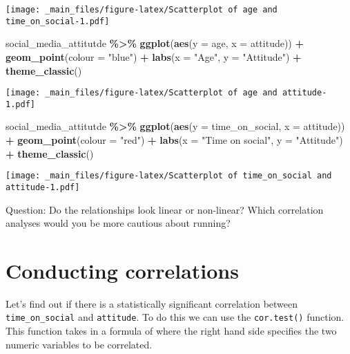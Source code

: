 \documentclass[
]{book}
\newenvironment{Shaded}{\begin{snugshade}}{\end{snugshade}}
\newcommand{\AttributeTok}[1]{\textcolor[rgb]{0.13,0.29,0.53}{#1}}
\newcommand{\FunctionTok}[1]{\textcolor[rgb]{0.13,0.29,0.53}{\textbf{#1}}}
\newcommand{\NormalTok}[1]{#1}
\newcommand{\SpecialCharTok}[1]{\textcolor[rgb]{0.81,0.36,0.00}{\textbf{#1}}}
\newcommand{\StringTok}[1]{\textcolor[rgb]{0.31,0.60,0.02}{#1}}
\begin{document}
\texttt{[image: \_main\_files/figure-latex/Scatterplot of age and time\_on\_social-1.pdf]}

\begin{Shaded}
\begin{Highlighting}[]
\NormalTok{social\_media\_attitutde }\SpecialCharTok{\%\textgreater{}\%} 
  \FunctionTok{ggplot}\NormalTok{(}\FunctionTok{aes}\NormalTok{(}\AttributeTok{y =}\NormalTok{ age, }\AttributeTok{x =}\NormalTok{ attitude)) }\SpecialCharTok{+}
  \FunctionTok{geom\_point}\NormalTok{(}\AttributeTok{colour =} \StringTok{"blue"}\NormalTok{) }\SpecialCharTok{+}
  \FunctionTok{labs}\NormalTok{(}\AttributeTok{x =} \StringTok{"Age"}\NormalTok{, }\AttributeTok{y =} \StringTok{"Attitude"}\NormalTok{) }\SpecialCharTok{+}
  \FunctionTok{theme\_classic}\NormalTok{() }
\end{Highlighting}
\end{Shaded}

\texttt{[image: \_main\_files/figure-latex/Scatterplot of age and attitude-1.pdf]}

\begin{Shaded}
\begin{Highlighting}[]
\NormalTok{social\_media\_attitutde }\SpecialCharTok{\%\textgreater{}\%} 
  \FunctionTok{ggplot}\NormalTok{(}\FunctionTok{aes}\NormalTok{(}\AttributeTok{y =}\NormalTok{ time\_on\_social, }\AttributeTok{x =}\NormalTok{ attitude)) }\SpecialCharTok{+}
  \FunctionTok{geom\_point}\NormalTok{(}\AttributeTok{colour =} \StringTok{"red"}\NormalTok{) }\SpecialCharTok{+}
  \FunctionTok{labs}\NormalTok{(}\AttributeTok{x =} \StringTok{"Time on social"}\NormalTok{, }\AttributeTok{y =} \StringTok{"Attitude"}\NormalTok{) }\SpecialCharTok{+}
  \FunctionTok{theme\_classic}\NormalTok{() }
\end{Highlighting}
\end{Shaded}

\texttt{[image: \_main\_files/figure-latex/Scatterplot of time\_on\_social and attitude-1.pdf]}

Question: Do the relationships look linear or non-linear? Which correlation analyses would you be more cautious about running?

\section{Conducting correlations}\label{conducting-correlations}

Let's find out if there is a statistically significant correlation between \texttt{time\_on\_social} and \texttt{attitude}. To do this we can use the \texttt{cor.test()} function. This function takes in a formula
of where the right hand side specifies the two numeric variables to be correlated.
\end{document}
